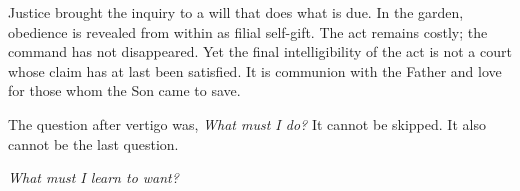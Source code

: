 Justice brought the inquiry to a will that does what is due. In the garden, obedience is revealed from within as filial self-gift. The act remains costly; the command has not disappeared. Yet the final intelligibility of the act is not a court whose claim has at last been satisfied. It is communion with the Father and love for those whom the Son came to save.

The question after vertigo was, \emph{What must I do?} It cannot be skipped. It also cannot be the last question.

\begin{center}
\emph{What must I learn to want?}
\end{center}
